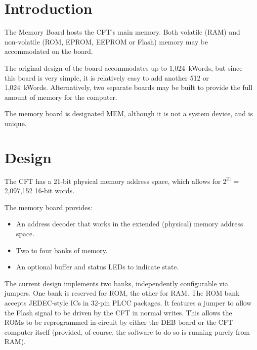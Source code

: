 \label{chap:mem}



\section{Introduction}

The Memory Board hosts the CFT's main memory. Both volatile (RAM) and
non-volatile (ROM, EPROM, EEPROM or Flash) memory may be accommodated on the
board.

The original design of the board accommodates up to 1,024~kWords, but since
this board is very simple, it is relatively easy to add another 512 or
1,024~kWords. Alternatively, two separate boards may be built to provide the
full amount of memory for the computer.

The memory board is designated \gls{MEM}, although it is not a system device,
and is unique.

\section{Design}

The CFT has a 21-bit physical memory address space, which allows for $2^{21}
=$~ 2,097,152 16-bit words.

The memory board provides:

\begin{itemize}
\item An address decoder that works in the extended (physical) memory address
  space.
\item Two to four banks of memory.
\item An optional buffer and status LEDs to indicate state.
\end{itemize}

The current design implements two banks, independently configurable via
jumpers. One bank is reserved for ROM, the other for RAM. The ROM bank accepts
JEDEC-style ICs in 32-pin \gls{PLCC} packages. It features a jumper to allow
the Flash  signal to be driven by the CFT in normal writes. This allows
the ROMs to be reprogrammed in-circuit by either the \gls{DEB} board or the CFT
computer itself (provided, of course, the software to do so is running purely
from RAM).


